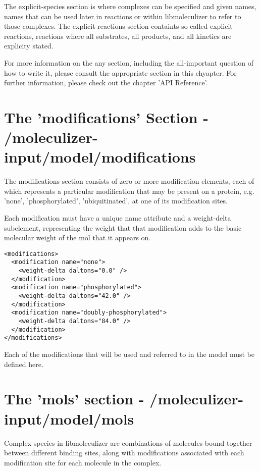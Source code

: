 The explicit-species section is where complexes can be specified and
given names, names that can be used later in reactions or within
libmoleculizer to refer to those complexes.  The explicit-reactions
section containts so called explicit reactions, reactions where all
substrates, all products, and all kinetics are explicity stated.  

For more information on the any section, including the all-important
question of how to write it, please consult the appropriate section in
this chyapter.  For further information, please check out the chapter
'API Reference'.  

\section{The 'modifications' Section -
  /moleculizer-input/model/modifications } 
The modifications section consists of zero or more modification elements,
each of which represents a particular modification that may be present
on a protein, e.g. 'none', 'phosphorylated', 'ubiquitinated', at one
of its modification sites.

Each modification must have a unique name attribute and a weight-delta
subelement, representing the weight that that modification adds to the
basic molecular weight of the mol that it appears on.  

\lstset{language=XML}
\begin{lstlisting}[caption=A Sample Modifications Section, label=modifications ]
<modifications>
  <modification name="none">
    <weight-delta daltons="0.0" />
  </modification>
  <modification name="phosphorylated">
    <weight-delta daltons="42.0" />
  </modification>
  <modification name="doubly-phosphorylated">
    <weight-delta daltons="84.0" />
  </modification>
</modifications>
\end{lstlisting}

Each of the modifications that will be used and referred to in the
model must be defined here. 

\section{The 'mols' section - /moleculizer-input/model/mols}

Complex species in libmoleculizer are combinations of molecules bound
together between different binding sites, along with modifications
associated with each modification site for each molecule in the complex.  


